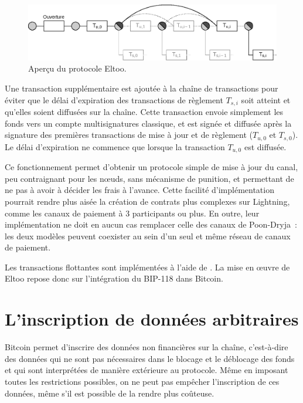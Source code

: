 \begin{figure}[h]
  \centering
  \includegraphics[scale=0.7]{img/eltoo-offchain-protocol.eps}
  \caption{Aperçu du protocole Eltoo.}
  \label{fig:eltoo}
\end{figure}

Une transaction supplémentaire est ajoutée à la chaîne de transactions pour éviter que le délai d'expiration des transactions de règlement $T_{s,i}$ soit atteint et qu'elles soient diffusées sur la chaîne. Cette transaction envoie simplement les fonds vers un compte multisignatures classique, et est signée et diffusée après la signature des premières transactions de mise à jour et de règlement ($T_{u,0}$ et $T_{s,0}$). Le délai d'expiration ne commence que lorsque la transaction $T_{u,0}$ est diffusée.

Ce fonctionnement permet d'obtenir un protocole simple de mise à jour du canal, peu contraignant pour les nœuds, sans mécanisme de punition, et permettant de ne pas à avoir à décider les frais à l'avance. Cette facilité d'implémentation pourrait rendre plus aisée la création de contrats plus complexes sur Lightning, comme les canaux de paiement à 3 participants ou plus. En outre, leur implémentation ne doit en aucun cas remplacer celle des canaux de Poon-Dryja~: les deux modèles peuvent coexister au sein d'un seul et même réseau de canaux de paiement.

Les transactions flottantes sont implémentées à l'aide de . La mise en œuvre de Eltoo repose donc sur l'intégration du BIP-118 dans Bitcoin.

\section*{L'inscription de données arbitraires}

Bitcoin permet d'inscrire des données non financières sur la chaîne, c'est-à-dire des données qui ne sont pas nécessaires dans le blocage et le déblocage des fonds et qui sont interprétées de manière extérieure au protocole. Même en imposant toutes les restrictions possibles, on ne peut pas empêcher l'inscription de ces données, même s'il est possible de la rendre plus coûteuse.

